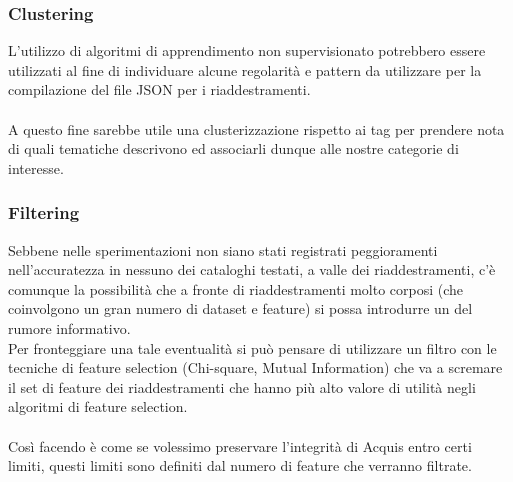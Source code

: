\documentclass{article}
\theoremstyle{plain}
\theoremstyle{definition}
\begin{document}
\subsubsection{Clustering}
L'utilizzo di algoritmi di apprendimento non supervisionato potrebbero essere utilizzati al fine di individuare alcune regolarità e pattern da utilizzare per la compilazione del file JSON per i riaddestramenti.
\\
\\
A questo fine sarebbe utile una clusterizzazione rispetto ai tag per prendere nota di quali tematiche descrivono ed associarli dunque alle nostre categorie di interesse.

\subsubsection{Filtering}
Sebbene nelle sperimentazioni non siano stati registrati peggioramenti nell'accuratezza in nessuno dei cataloghi testati, a valle dei riaddestramenti, c'è comunque la possibilità che a fronte di riaddestramenti molto corposi (che coinvolgono un gran numero di dataset e feature) si possa introdurre un del rumore informativo.
\\
Per fronteggiare una tale eventualità si può pensare di utilizzare un filtro con le tecniche di feature selection (Chi-square, Mutual Information) che va a scremare il set di feature dei riaddestramenti che hanno più alto valore di utilità negli algoritmi di feature selection.
\\
\\
Così facendo è come se volessimo preservare l'integrità di Acquis entro certi limiti, questi limiti sono definiti dal numero di feature che verranno filtrate.
\newpage
\end{document}
